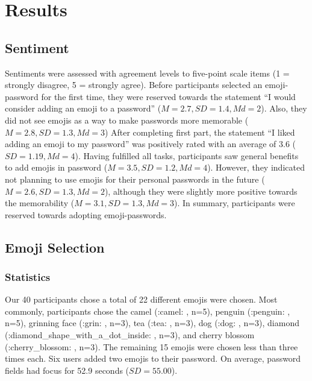 \section{Results}
\subsection{Sentiment}
Sentiments were assessed with agreement levels to five-point scale items (1 = strongly disagree, 5 = strongly agree).
Before participants selected an emoji-password for the first time, they were reserved towards the statement ``I would consider adding an emoji to a password'' ($M=2.7, SD = 1.4, Md=2$). Also, they did not see emojis as a way to make passwords more memorable ($M=2.8, SD = 1.3, Md=3$)
After completing first part, the statement ``I liked adding an emoji to my password'' was positively rated with an average of 3.6 ($SD=1.19, Md=4$). 
Having fulfilled all tasks, participants saw general benefits to add emojis in password ($M=3.5, SD = 1.2, Md=4$). 
However, they indicated not planning to use emojis for their personal passwords in the future ($M=2.6, SD = 1.3, Md=2$), although they were slightly more positive towards the memorability ($M=3.1, SD = 1.3, Md=3$). 
In summary, participants were reserved towards adopting emoji-passwords.

\subsection{Emoji Selection}
\subsubsection{Statistics}
Our 40 participants chose a total of 22 different emojis were chosen. Most commonly, participants chose the camel (:camel: , n=5), penguin (:penguin: , n=5), grinning face (:grin: , n=3), tea (:tea: , n=3), dog (:dog: , n=3), diamond (:diamond\_shape\_with\_a\_dot\_inside: , n=3), and cherry blossom (:cherry\_blossom: , n=3). The remaining 15 emojis were chosen less than three times each. Six users added two emojis to their password. On average, password fields had focus for 52.9 seconds ($SD = 55.00$).

